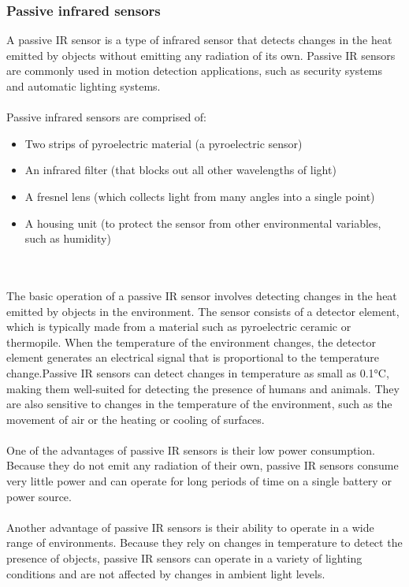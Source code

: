 \documentclass[12pt]{article}
\begin{document}
\subsubsection{Passive infrared sensors}
A passive IR sensor is a type of infrared sensor that detects changes in the heat emitted by objects without emitting any radiation of its own. Passive IR sensors are commonly used in motion detection applications, such as security systems and automatic lighting systems.
\\
\\
Passive infrared sensors are comprised of:
\begin{itemize}
\item Two strips of pyroelectric material (a pyroelectric sensor)
\item An infrared filter (that blocks out all other wavelengths of light)
\item A fresnel lens (which collects light from many angles into a single point)
\item A housing unit (to protect the sensor from other environmental variables, such as humidity)
\end{itemize}
\\
\\
The basic operation of a passive IR sensor involves detecting changes in the heat emitted by objects in the environment. The sensor consists of a detector element, which is typically made from a material such as pyroelectric ceramic or thermopile. When the temperature of the environment changes, the detector element generates an electrical signal that is proportional to the temperature change.Passive IR sensors can detect changes in temperature as small as 0.1°C, making them well-suited for detecting the presence of humans and animals. They are also sensitive to changes in the temperature of the environment, such as the movement of air or the heating or cooling of surfaces.
\\
\\
One of the advantages of passive IR sensors is their low power consumption. Because they do not emit any radiation of their own, passive IR sensors consume very little power and can operate for long periods of time on a single battery or power source.
\\
\\
Another advantage of passive IR sensors is their ability to operate in a wide range of environments. Because they rely on changes in temperature to detect the presence of objects, passive IR sensors can operate in a variety of lighting conditions and are not affected by changes in ambient light levels.
\end{document}
